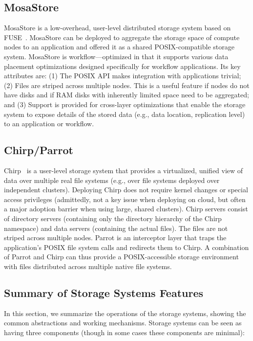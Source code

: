 \documentclass[10pt,journal,cspaper,compsoc]{IEEEtran}
\begin{document}
\subsection{MosaStore}
MosaStore is a low-overhead, user-level distributed storage system based on
FUSE~\cite{fuse_web}. MosaStore can be deployed to aggregate the storage space
of compute nodes to an application and offered it as a shared POSIX-compatible
storage system.  MosaStore is workflow—optimized in that it supports various
data placement optimizations designed specifically for workflow applications.
Its key attributes are: (1) The POSIX API makes integration with applications
trivial; (2) Files are striped across multiple nodes. This is a useful feature
if nodes do not have disks and if RAM disks with inherently limited space need
to be aggregated; and (3) Support is provided for cross-layer optimizations
that enable the storage system to expose details of the stored data (e.g., data
location, replication level) to an application or workflow. 

\subsection{Chirp/Parrot}
Chirp~\cite{chirp} is a user-level storage system that provides a virtualized,
unified view of data over multiple real file systems (e.g., over file systems
deployed over independent clusters). Deploying Chirp does not require kernel
changes or special access privileges (admittedly, not a key issue when
deploying on cloud, but often a major adoption barrier when using large, shared
clusters). Chirp servers consist of directory servers (containing only the
directory hierarchy of the Chirp name\-space) and data servers (containing the
actual files). The files are not striped across multiple nodes. Parrot is an
interceptor layer that traps the application's POSIX file system calls and
redirects them to Chirp. A combination of Parrot and Chirp can thus provide a
POSIX-accessible storage environment with files distributed across multiple
native file systems.

\subsection{Summary of Storage Systems Features}
In this section, we summarize the operations of the storage systems, showing
the common abstractions and working mechanisms. Storage systems can be seen as
having three components (though in some cases these components are minimal):
\end{document}
